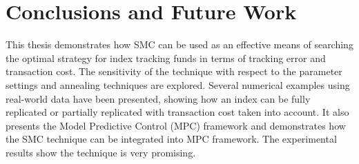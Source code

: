 \chapter{Conclusions and Future Work}
\graphicspath{{Chapter5/figures/}}
\label{cha:conclusions}
This thesis demonstrates how SMC can be used as an effective means of searching the optimal strategy for index tracking funds in terms of tracking error and transaction cost. The sensitivity of the technique with respect to the parameter settings and annealing techniques are explored. Several numerical examples using real-world data have been presented, showing how an index can be fully replicated or partially replicated with transaction cost taken into account. It also presents the Model Predictive Control (MPC) framework and demonstrates how the SMC technique can be integrated into MPC framework. The experimental results show the technique is very promising.

